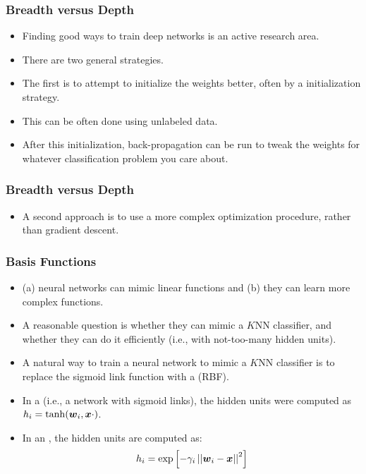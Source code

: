 \documentclass[trans]{beamer}
\begin{document}
\begin{frame}
  \frametitle{Breadth versus Depth}
\begin{itemize}
\item
Finding good ways to train deep networks is an active research area.
\item There are two general strategies. 
\item The first is to attempt to
initialize the weights better, often by a 
initialization strategy. 
\item This can be often done using unlabeled data.
\item After this initialization, back-propagation can be run to tweak the
weights for whatever classification problem you care about.  
\end{itemize}
\end{frame}

\begin{frame}
  \frametitle{Breadth versus Depth}
\begin{itemize}
\item
A second
approach is to use a more complex optimization procedure, rather than
gradient descent.  
\end{itemize}
\end{frame}


\begin{frame}
  \frametitle{Basis Functions}
\begin{itemize}
\item
 (a) neural networks can mimic linear
functions and (b) they can learn more complex functions.  
\item A reasonable
question is whether they can mimic a $K$NN classifier, and whether
they can do it efficiently (i.e., with not-too-many hidden units).
\item 
A natural way to train a neural network to mimic a $K$NN classifier is
to replace the sigmoid link function with a  (RBF).
\item  In a  (i.e., a network
with sigmoid links), the hidden units were computed as $h_i =
\tanh({\boldsymbol{w}}_i,{\boldsymbol{x}} \cdot )$.
\item  In an , the hidden
units are computed as:
%
\begin{equation}
h_i = \exp\left[ - \gamma_i \left\vert\left\vert {\boldsymbol{w}}_i - {\boldsymbol{x}} \right\vert\right\vert^2 \right]
\end{equation}
%
%
\end{itemize}
\end{frame}
\end{document}
